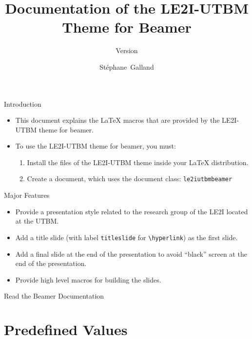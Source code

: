 \documentclass[english,sectioncirclenumberstyle]{le2iutbmbeamer}
\title{Documentation of the LE2I-UTBM Theme for Beamer}
\subtitle{Version \insertleiiutbmbeamerthemeversion}
\author[S.~Galland]{St\'ephane~Galland}
\begin{document}
\begin{frame}{Introduction}
	\begin{itemize}
	\item This document explains the {\LaTeX} macros that are provided by the LE2I-UTBM theme for beamer.
	\vfill
	\item To use the LE2I-UTBM theme for beamer, you must:
		\begin{enumerate}
		\item Install the files of the LE2I-UTBM theme inside your {\LaTeX} distribution.
		\item Create a document, which uses the document class: \texttt{le2iutbmbeamer}
		\end{enumerate}
	\end{itemize}
\end{frame}

\begin{frame}{Major Features}
	\begin{itemize}
	\item Provide a presentation style related to the research group of the LE2I located at the UTBM.
	\vfill
	\item Add a title slide (with label \texttt{titleslide} for \texttt{{\textbackslash}hyperlink}) as the first slide.
	\vfill
	\item Add a final slide at the end of the presentation to avoid ``black'' screen at the end of the presentation.
	\vfill
	\item Provide high level macros for building the slides.
	\end{itemize}
\end{frame}

\begin{frame}{Read the Beamer Documentation}
	\huge
	\vspace{2em}
\end{frame}

\tableofcontentslide

\section{Predefined Values}
\tableofcontentslide[sectionstyle={show/shaded},subsectionstyle={show/show/hide},subsubsectionstyle={hide/hide/hide/hide}]
\end{document}
